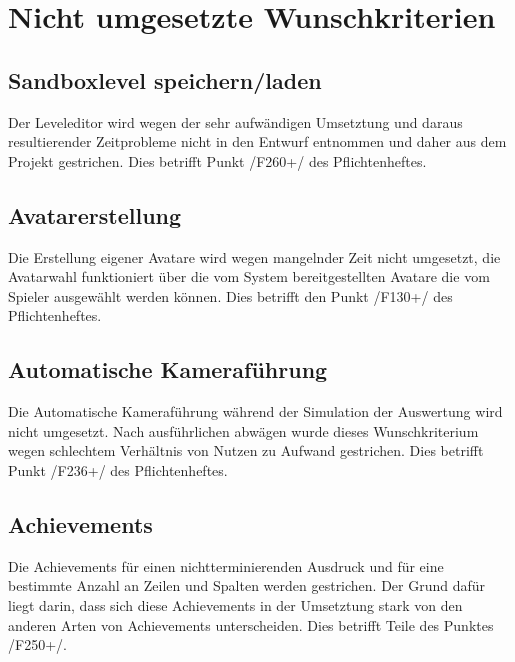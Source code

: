 \chapter{Nicht umgesetzte Wunschkriterien}

\section{Sandboxlevel speichern/laden}
	Der Leveleditor wird wegen der sehr aufwändigen Umsetztung und daraus resultierender Zeitprobleme 
nicht in den Entwurf entnommen und daher aus dem Projekt gestrichen. Dies betrifft Punkt /F260+/ des Pflichtenheftes.  
 
\section{Avatarerstellung}
Die Erstellung eigener Avatare wird wegen mangelnder Zeit nicht umgesetzt, die Avatarwahl funktioniert 
über die vom System bereitgestellten Avatare die vom Spieler ausgewählt werden können. Dies betrifft 
den Punkt /F130+/ des Pflichtenheftes.  

\section{Automatische Kameraführung}
Die Automatische Kameraführung während der Simulation der Auswertung wird nicht umgesetzt. Nach 
ausführlichen abwägen wurde dieses Wunschkriterium wegen schlechtem Verhältnis von Nutzen zu Aufwand 
gestrichen. Dies betrifft Punkt /F236+/ des Pflichtenheftes. 

\section{Achievements}
Die Achievements für einen nichtterminierenden Ausdruck und für eine bestimmte Anzahl an Zeilen und Spalten 
werden gestrichen. Der Grund dafür liegt darin, dass sich diese Achievements in der Umsetztung stark von den
anderen Arten von Achievements unterscheiden. Dies betrifft Teile des Punktes /F250+/.  

